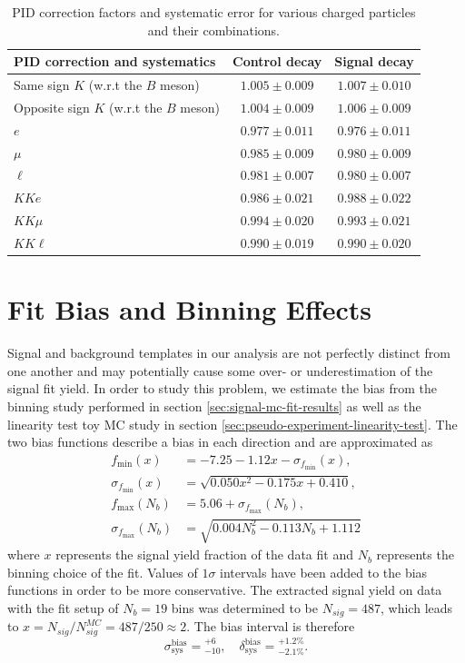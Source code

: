 \begin{table}[H]
	\centering
	\begin{tabular}{|l|c|c|}
		\hline
		PID correction and systematics & Control decay & Signal decay \\
		\hline
		Same sign $K$ (w.r.t the $B$ meson) & $1.005\pm 0.009$ & $1.007\pm 0.010$\\
		\hline
		Opposite sign $K$ (w.r.t the $B$ meson) & $1.004\pm 0.009$ & $1.006\pm 0.009$\\
		\hline
		$e$ & $0.977\pm 0.011$ & $0.976\pm 0.011$\\
		\hline
		$\mu$ & $0.985\pm 0.009$ & $0.980\pm 0.009$\\
		\hline
		$\ell$ & $0.981\pm 0.007$ & $0.980\pm 0.007$\\
		\hline
		\hline
		$KKe$ & $0.986 \pm 0.021$ & $0.988\pm 0.022$\\
		\hline
		$KK\mu$ & $0.994 \pm 0.020$ & $0.993\pm 0.021$\\
		\hline
		$KK\ell$ & $0.990 \pm 0.019$ & $0.990\pm 0.020$\\
		\hline
	\end{tabular}
	\captionsetup{width=0.8\linewidth}
	\caption{PID correction factors and systematic error for various charged particles and their combinations.}
	\label{tab:PID}
\end{table}

\section{Fit Bias and Binning Effects}
Signal and background templates in our analysis are not perfectly distinct from one another and may potentially cause some over- or underestimation of the signal fit yield. In order to study this problem, we estimate the bias from the binning study performed in section \ref{sec:signal-mc-fit-results} as well as the linearity test toy MC study in section \ref{sec:pseudo-experiment-linearity-test}. The two bias functions describe a bias in each direction and are approximated as
\begin{align}
f_{\mathrm{min}}(x) &= -7.25-1.12x - \sigma_{f_{\mathrm{min}}}(x), \\
\sigma_{f_{\mathrm{min}}}(x) &= \sqrt{0.050 x^2 - 0.175 x + 0.410}, \\
f_{\mathrm{max}}(N_b) &= 5.06 + \sigma_{f_{\mathrm{max}}}(N_b), \\
\sigma_{f_{\mathrm{max}}}(N_b) &= \sqrt{0.004N_b^2 - 0.113 N_b + 1.112}
\end{align}
where $x$ represents the signal yield fraction of the data fit and $N_b$ represents the binning choice of the fit. Values of $1\sigma$ intervals have been added to the bias functions in order to be more conservative. The extracted signal yield on data  with the fit setup of $N_b=19$ bins was determined to be $N_{sig} = 487$, which leads to $x = N_{sig} / N_{sig}^{MC} = 487 / 250 \approx 2$. The bias interval is therefore
\begin{equation}
\sigma_{\mathrm{sys}}^{\mathrm{bias}} = {}^{+6}_{-10},\quad \delta_{\mathrm{sys}}^{\mathrm{bias}} = {}^{+1.2\%}_{-2.1\%}.
\end{equation}

